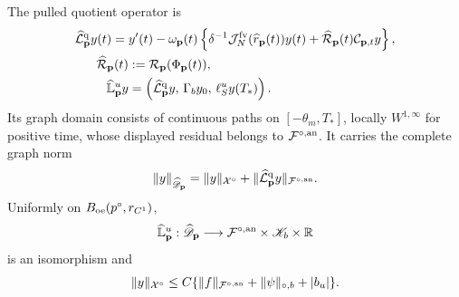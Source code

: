 \begin{lemma}
The pulled quotient operator is
\begin{align}
 \widehat{\mathcal L}_{\mathbf p}^{\rm q}y(t)
={}&y'(t)-\omega_{\mathbf p}(t)
 \left\{\delta^{-1}
       \mathcal J_N^{\rm fv}(\widehat r_{\mathbf p}(t))y(t)
       +\widehat{\mathcal R}_{\mathbf p}(t)
          \mathcal C_{\mathbf p,t}y\right\},\notag\\
 \widehat{\mathcal R}_{\mathbf p}(t)
 &:=\mathcal R_{\mathbf p}(\Phi_{\mathbf p}(t)),           \label{eq:oe-fixed-action-pulled-operator}\\
 \widehat{\mathbb L}_{\mathbf p}^{u}y
 &=
 \left(\widehat{\mathcal L}_{\mathbf p}^{\rm q}y,\,
       \Gamma_by_0,\,
       \ell_S^uy(T_*)\right).                  \label{eq:oe-fixed-action-current-bvp}
\end{align}
Its graph domain consists of continuous paths on
\([-\theta_m,T_*]\), locally \(W^{1,\infty}\) for positive time, whose
displayed residual belongs to \(\mathcal F^{\circ,\rm an}\).
It carries the complete graph norm
\begin{equation}
 \|y\|_{\widehat{\mathscr D}_{\mathbf p}}
 =\|y\|_{\mathcal X^\circ}
  +\|\widehat{\mathcal L}_{\mathbf p}^{\rm q}y\|_
       {\mathcal F^{\circ,\rm an}}.            \label{eq:oe-fixed-action-domain-norm}
\end{equation}
Uniformly on \(B_{\rm oe}(p^\circ,r_{C^1})\),
\begin{equation}
 \widehat{\mathbb L}_{\mathbf p}^{u}:
 \widehat{\mathscr D}_{\mathbf p}
 \longrightarrow
 \mathcal F^{\circ,\rm an}\times\mathscr K_b\times\mathbb R
                                                        \label{eq:oe-fixed-action-current-isomorphism}
\end{equation}
is an isomorphism and
\begin{equation}
 \|y\|_{\mathcal X^\circ}
 \le C\{\|f\|_{\mathcal F^{\circ,\rm an}}
       +\|\psi\|_{\circ,b}+|b_u|\}.            \label{eq:oe-fixed-action-green-bound}
\end{equation}


\end{lemma}
